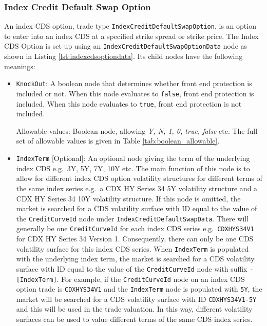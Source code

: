 \subsubsection{Index Credit Default Swap Option}

An index CDS option, trade type \lstinline!IndexCreditDefaultSwapOption!, is an option to enter into an index CDS at a specified strike spread or strike price. The Index CDS Option is set up using an \lstinline!IndexCreditDefaultSwapOptionData! node as shown in Listing \ref{lst:indexcdsoptiondata}. Its child nodes have the following meanings:

\begin{itemize}
\item
\lstinline!KnockOut!: A boolean node that determines whether front end protection is included or not. When this node evaluates to \lstinline!false!, front end protection is included. When this node evaluates to \lstinline!true!, front end protection is not included.

Allowable values: Boolean node, allowing \emph{Y, N, 1, 0, true, false} etc. The full set of allowable values is given in Table \ref{tab:boolean_allowable}.

\item
\lstinline!IndexTerm! [Optional]: An optional node giving the term of the underlying index CDS e.g.\ 3Y, 5Y, 7Y, 10Y etc. The main function of this node is to allow for different index CDS option volatility structures for different terms of the same index series e.g.\ a CDX HY Series 34 5Y volatility structure and a CDX HY Series 34 10Y volatility structure. If this node is omitted, the market is searched for a CDS volatility surface with ID equal to the value of the \lstinline!CreditCurveId! node under \lstinline!IndexCreditDefaultSwapData!. There will generally be one \lstinline!CreditCurveId! for each index CDS series e.g.\ \lstinline!CDXHYS34V1! for CDX HY Series 34 Version 1. Consequently, there can only be one CDS volatility surface for this index CDS series. When \lstinline!IndexTerm! is populated with the underlying index term, the market is searched for a CDS volatility surface with ID equal to the value of the \lstinline!CreditCurveId! node with suffix \lstinline!-[IndexTerm]!. For example, if the \lstinline!CreditCurveId! node on an index CDS option trade is \lstinline!CDXHYS34V1! and the \lstinline!IndexTerm! node is populated with \lstinline!5Y!, the market will be searched for a CDS volatility surface with ID \lstinline!CDXHYS34V1-5Y! and this will be used in the trade valuation. In this way, different volatility surfaces can be used to value different terms of the same CDS index series.


\end{itemize}
